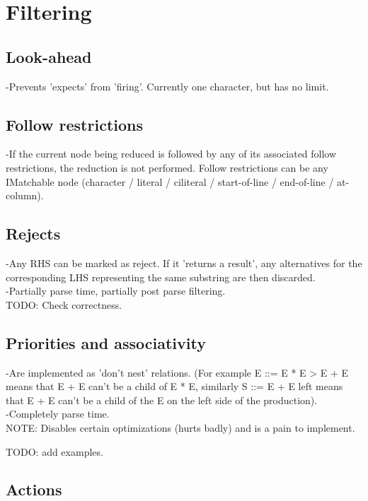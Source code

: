\documentclass[a4paper,10pt]{article}
\begin{document}
\section{Filtering}

\subsection{Look-ahead}

-Prevents 'expects' from 'firing'. Currently one character, but has no limit.

\subsection{Follow restrictions}

-If the current node being reduced is followed by any of its associated follow restrictions, the reduction is not performed. Follow restrictions can be any IMatchable node (character / literal / ciliteral / start-of-line / end-of-line / at-column).

\subsection{Rejects}

-Any RHS can be marked as reject. If it 'returns a result', any alternatives for the corresponding LHS representing the same substring are then discarded.\\
-Partially parse time, partially post parse filtering. \\
TODO: Check correctness.

\subsection{Priorities and associativity}

-Are implemented as 'don't nest' relations. (For example E ::= E * E > E + E means that E + E can't be a child of E * E, similarly S ::= E + E {left} means that E + E can't be a child of the E on the left side of the production).\\
-Completely parse time.\\
NOTE: Disables certain optimizations (hurts badly) and is a pain to implement.

TODO: add examples.

\subsection{Actions}
\end{document}
